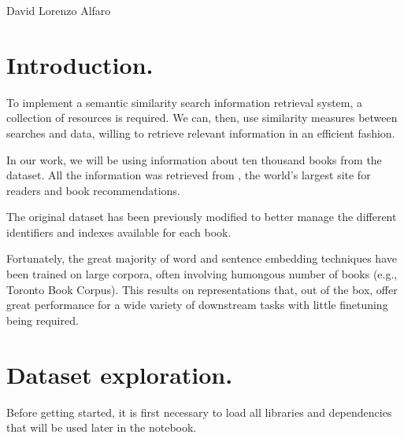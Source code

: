 \documentclass[letterpaper,10pt,english]{sphinxmanual}
\begin{document}
David Lorenzo Alfaro




\section{Introduction.}
\label{\detokenize{Data preprocessing:Introduction.}}
To implement a semantic similarity search information retrieval system, a collection of resources is required. We can, then, use similarity measures between searches and data, willing to retrieve relevant information in an efficient fashion.

In our work, we will be using information about ten thousand books from the   dataset. All the information was retrieved from , the world’s largest site for readers and book recommendations.



The original dataset has been previously modified to better manage the different identifiers and indexes available for each book.



Fortunately, the great majority of word and sentence embedding techniques have been trained on large corpora, often involving humongous number of books (e.g., Toronto Book Corpus). This results on representations that, out of the box, offer great performance for a wide variety of downstream tasks with little fine\sphinxhyphen{}tuning being required.


\section{Dataset exploration.}
\label{\detokenize{Data preprocessing:Dataset-exploration.}}
Before getting started, it is first necessary to load all libraries and dependencies that will be used later in the notebook.

{
\begin{sphinxVerbatim}[commandchars=\\\{\}]
\llap{\color{nbsphinxin}[4]:\,\hspace{\fboxrule}\hspace{\fboxsep}} 
   
   
   
   
   
\end{sphinxVerbatim}
}
\end{document}
